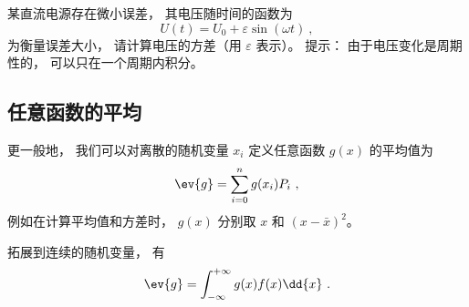 \begin{exercise}{}
某直流电源存在微小误差， 其电压随时间的函数为
\begin{equation}
U(t) = U_0 + \varepsilon \sin(\omega t)~,
\end{equation}
为衡量误差大小， 请计算电压的方差（用 $\varepsilon$ 表示）。 提示： 由于电压变化是周期性的， 可以只在一个周期内积分。
\end{exercise}

\subsection{任意函数的平均}
更一般地， 我们可以对离散的随机变量 $x_i$ 定义任意函数 $g(x)$ 的平均值为
\begin{equation}\label{eq_RandF_3}
\ev{g} = \sum_{i=0}^n g(x_i) P_i~,
\end{equation}
例如在计算平均值和方差时， $g(x)$ 分别取 $x$ 和 $(x - \bar x)^2$。

拓展到连续的随机变量， 有
\begin{equation}\label{eq_RandF_2}
\ev{g} = \int_{-\infty}^{+\infty} g(x) f(x) \dd{x}~.
\end{equation}

